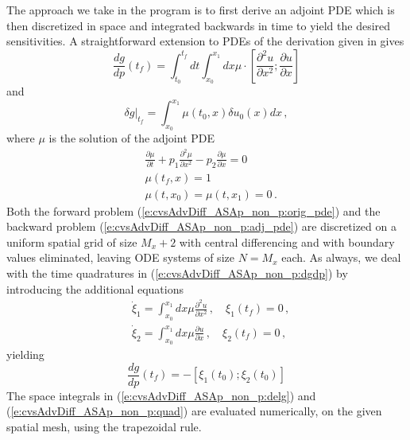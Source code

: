 The approach we take in the program  is to first derive an 
adjoint PDE which is then discretized in space and integrated backwards
in time to yield the desired sensitivities. A straightforward extension 
to PDEs of the derivation given in  gives
\begin{equation}\label{e:cvsAdvDiff_ASAp_non_p:dgdp}
  \frac{dg}{dp} (t_f) = \int_{t_0}^{t_f} dt 
  \int_{x_0}^{x_1} dx \mu \cdot 
  \left[
    \frac{\partial^2 u}{\partial x^2} ;
    \frac{\partial u}{\partial x}
  \right ]
\end{equation}
and
\begin{equation}\label{e:cvsAdvDiff_ASAp_non_p:delg}
  \delta g |_{t_f} = \int_{x_0}^{x_1} \mu(t_0,x) \delta u_0(x) dx \, , 
\end{equation}
where $\mu$ is the solution of the adjoint PDE
\begin{equation}\label{e:cvsAdvDiff_ASAp_non_p:adj_pde}
  \begin{split}
    & \frac{\partial \mu}{\partial t} + p_1 \frac{\partial^2 \mu}{\partial x^2} 
    - p_2 \frac{\partial \mu}{\partial x} = 0 \\
    & \mu(t_f , x) = 1 \\
    & \mu(t , x_0) = \mu( t , x_1 ) = 0 \, .
  \end{split}
\end{equation}
Both the forward problem (\ref{e:cvsAdvDiff_ASAp_non_p:orig_pde}) and the backward
problem (\ref{e:cvsAdvDiff_ASAp_non_p:adj_pde}) are discretized on a uniform spatial
grid of size $M_x + 2$ with central differencing and with boundary values eliminated,
leaving ODE systems of size $N = M_x$ each.  As always, we deal with the time
quadratures in (\ref{e:cvsAdvDiff_ASAp_non_p:dgdp}) by introducing the additional
equations
\begin{equation}\label{e:cvsAdvDiff_ASAp_non_p:quad}
  \begin{split}
    &{\dot\xi}_1 = \int_{x_0}^{x_1} dx \mu \frac{\partial^2 u}{\partial x^2} \, , \quad
    \xi_1(t_f) = 0 \, , \\
    &{\dot\xi}_2 = \int_{x_0}^{x_1} dx \mu \frac{\partial u}{\partial x} \, , \quad
    \xi_2(t_f) = 0 \, ,
  \end{split}
\end{equation}
yielding
\begin{equation*}
  \frac{dg}{dp} (t_f) = - \left[ \xi_1(t_0) ; \xi_2(t_0) \right ]
\end{equation*}
The space integrals in (\ref{e:cvsAdvDiff_ASAp_non_p:delg}) and
(\ref{e:cvsAdvDiff_ASAp_non_p:quad}) are
evaluated numerically, on the given spatial mesh, using the trapezoidal rule.


